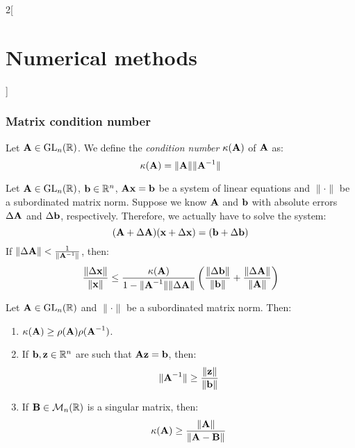 \documentclass[../../../main.tex]{subfiles}
\begin{document}
\begin{multicols}{2}[\section{Numerical methods}]
  \subsubsection{Matrix condition number}
  \begin{definition}
    Let $\vf{A}\in\GL_n(\RR)$. We define the \emph{condition number} $\kappa(\vf{A})$ of $\vf{A}$ as: $$\kappa(\vf{A})=\|\vf{A}\|\|\vf{A}^{-1}\|$$
  \end{definition}
  \begin{theorem}
    Let $\vf{A}\in\GL_n(\RR)$, $\vf{b}\in\RR^n$, $\vf{A}\vf{x}=\vf{b}$ be a system of linear equations and $\|\cdot\|$ be a subordinated matrix norm. Suppose we know $\vf{A}$ and $\vf{b}$ with absolute errors $\Delta\vf{A}$ and $\Delta\vf{b}$, respectively. Therefore, we actually have to solve the system: $$(\vf{A}+\Delta\vf{A})(\vf{x}+\Delta \vf{x})=(\vf{b}+\Delta\vf{b})$$ If $\|\Delta\vf{A}\|<\frac{1}{\|\vf{A}^{-1}\|}$, then: $$\frac{\|\Delta \vf{x}\|}{\|\vf{x}\|}\leq\frac{\kappa(\vf{A})}{1-\norm{\vf{A}^{-1}}\norm{\Delta\vf{A}}}\left(\frac{\norm{\Delta\vf{b}}}{\norm{\vf{b}}}+\frac{\norm{\Delta\vf{A}}}{\norm{\vf{A}}}\right)$$
  \end{theorem}
  \begin{theorem}
    Let $\vf{A}\in\GL_n(\RR)$ and $\|\cdot\|$ be a subordinated matrix norm. Then:
    \begin{enumerate}
      \item $\kappa(\vf{A})\geq\rho(\vf{A})\rho(\vf{A}^{-1})$.
      \item If $\vf{b},\vf{z}\in\RR^n$ are such that $\vf{A}\vf{z}=\vf{b}$, then: $$\norm{\vf{A}^{-1}}\geq\frac{\norm{\vf{z}}}{\norm{\vf{b}}}$$
      \item If $\vf{B}\in\mathcal{M}_n(\RR)$ is a singular matrix, then: $$\kappa(\vf{A})\geq\frac{\norm{\vf{A}}}{\norm{\vf{A}-\vf{B}}}$$
    \end{enumerate}
  \end{theorem}

\end{multicols}
\end{document}
